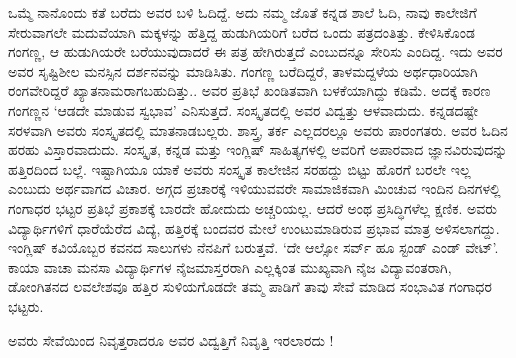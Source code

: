 ಒಮ್ಮೆ ನಾನೊಂದು ಕತೆ ಬರೆದು ಅವರ ಬಳಿ ಓದಿದ್ದೆ. ಅದು ನಮ್ಮ ಜೊತೆ ಕನ್ನಡ ಶಾಲೆ ಓದಿ, ನಾವು ಕಾಲೇಜಿಗೆ ಸೇರುವಾಗಲೇ ಮದುವೆಯಾಗಿ ಮಕ್ಕಳನ್ನು ಹೆತ್ತಿದ್ದ ಹುಡುಗಿಯರಿಗೆ ಬರೆದ ಒಂದು ಪತ್ರದಂತಿತ್ತು. ಕೇಳಿಸಿಕೊಂಡ ಗಂಗಣ್ಣ, ಆ ಹುಡುಗಿಯರೇ  ಬರೆಯುವುದಾದರೆ ಈ ಪತ್ರ ಹೇಗಿರುತ್ತದೆ ಎಂಬುದನ್ನೂ ಸೇರಿಸು ಎಂದಿದ್ದ. ಇದು ಅವರ ಅವರ ಸೃಷ್ಟಿಶೀಲ ಮನಸ್ಸಿನ ದರ್ಶನವನ್ನು ಮಾಡಿಸಿತು. ಗಂಗಣ್ಣ ಬರೆದಿದ್ದರೆ, ತಾಳಮದ್ದಳೆಯ ಅರ್ಥಧಾರಿಯಾಗಿ ರಂಗವೇರಿದ್ದರೆ ಖ್ಯಾತನಾಮರಾಗಬಹುದಿತ್ತು.. ಅವರ ಪ್ರತಿಭೆ ಖಂಡಿತವಾಗಿ  ಬಳಕೆಯಾಗಿದ್ದು ಕಡಿಮೆ. ಅದಕ್ಕೆ ಕಾರಣ ಗಂಗಣ್ಣನ ‘ಆಡದೇ ಮಾಡುವ ಸ್ವಭಾವ’ ಎನಿಸುತ್ತದೆ. ಸಂಸ್ಕೃತದಲ್ಲಿ ಅವರ ವಿದ್ವತ್ತು ಆಳವಾದುದು. ಕನ್ನಡದಷ್ಟೇ ಸರಳವಾಗಿ ಅವರು ಸಂಸ್ಕೃತದಲ್ಲಿ ಮಾತನಾಡಬಲ್ಲರು. ಶಾಸ್ತ್ರ, ತರ್ಕ ಎಲ್ಲದರಲ್ಲೂ ಅವರು ಪಾರಂಗತರು. ಅವರ ಓದಿನ ಹರಹು ವಿಸ್ತಾರವಾದುದು. ಸಂಸ್ಕೃತ,  ಕನ್ನಡ ಮತ್ತು ಇಂಗ್ಲಿಷ್ ಸಾಹಿತ್ಯಗಳಲ್ಲಿ  ಅವರಿಗೆ ಅಪಾರವಾದ ಜ್ಞಾನವಿರುವುದನ್ನು ಹತ್ತಿರದಿಂದ ಬಲ್ಲೆ. ಇಷ್ಟಾಗಿಯೂ ಯಾಕೆ ಅವರು ಸಂಸ್ಕೃತ ಕಾಲೇಜಿನ ಸರಹದ್ದು ಬಿಟ್ಟು ಹೊರಗೆ ಬರಲೇ ಇಲ್ಲ ಎಂಬುದು ಅರ್ಥವಾಗದ ವಿಚಾರ. ಅಗ್ಗದ ಪ್ರಚಾರಕ್ಕೆ ಇಳಿಯುವವರೇ ಸಾಮಾಜಿಕವಾಗಿ ಮಿಂಚುವ ಇಂದಿನ ದಿನಗಳಲ್ಲಿ ಗಂಗಾಧರ ಭಟ್ಟರ ಪ್ರತಿಭೆ ಪ್ರಕಾಶಕ್ಕೆ ಬಾರದೇ ಹೋದುದು ಅಚ್ಚರಿಯಲ್ಲ. ಆದರೆ ಅಂಥ ಪ್ರಸಿದ್ಧಿಗಳೆಲ್ಲ ಕ್ಷಣಿಕ. ಅವರು ವಿದ್ಯಾರ್ಥಿಗಳಿಗೆ ಧಾರೆಯೆರೆದ ವಿದ್ಯೆ, ಹತ್ತಿರಕ್ಕೆ ಬಂದವರ ಮೇಲೆ ಉಂಟುಮಾಡಿರುವ ಪ್ರಭಾವ ಮಾತ್ರ ಅಳಿಸಲಾಗದ್ದು. ಇಂಗ್ಲಿಷ್ ಕವಿಯೊಬ್ಬರ ಕವನದ ಸಾಲುಗಳು ನೆನಪಿಗೆ ಬರುತ್ತವೆ. ‘ದೇ ಆಲ್ಸೋ ಸರ್ವ್ ಹೂ ಸ್ಟಂಡ್ ಎಂಡ್ ವೇಟ್’. ಕಾಯಾ ವಾಚಾ ಮನಸಾ ವಿದ್ಯಾರ್ಥಿಗಳ ನೈಜಮಾಸ್ತರರಾಗಿ ಎಲ್ಲಕ್ಕಿಂತ ಮುಖ್ಯವಾಗಿ ನೈಜ ವಿದ್ಯಾವಂತರಾಗಿ, ಡೋಂಗಿತನದ ಲವಲೇಶವೂ ಹತ್ತಿರ ಸುಳಿಯಗೊಡದೇ ತಮ್ಮ ಪಾಡಿಗೆ ತಾವು ಸೇವೆ ಮಾಡಿದ ಸಂಭಾವಿತ ಗಂಗಾಧರ ಭಟ್ಟರು. 

ಅವರು ಸೇವೆಯಿಂದ ನಿವೃತ್ತರಾದರೂ ಅವರ ವಿದ್ವತ್ತಿಗೆ  ನಿವೃತ್ತಿ ಇರಲಾರದು !
